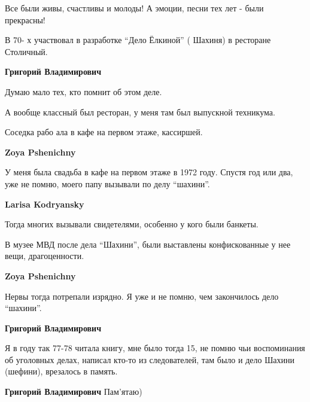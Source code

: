 \begin{itemize}
\begin{itemize}
Все были живы, счастливы и молоды! А эмоции, песни тех лет - были прекрасны!
\end{itemize} %


В 70- х участвовал в разработке \enquote{Дело Ёлкиной} ( Шахиня) в ресторане
Столичный.

\begin{itemize} %
\textbf{Григорий Владимирович} 

Думаю мало тех, кто помнит об этом деле.

А вообще классный был ресторан, у меня там был выпускной техникума.

Соседка рабо ала в кафе на первом этаже, кассиршей.

\begin{itemize} %
\textbf{Zoya Pshenichny} 

У меня была свадьба в кафе на первом этаже в 1972 году. Спустя год или два, уже
не помню, моего папу вызывали по делу \enquote{шахини}.

\textbf{Larisa Kodryansky} 

Тогда многих вызывали свидетелями, особенно у кого были банкеты.

В музее МВД после дела \enquote{Шахини}, были выставлены конфискованные у нее вещи,
драгоценности.

\textbf{Zoya Pshenichny} 

Нервы тогда потрепали изрядно. Я уже и не помню, чем закончилось дело \enquote{шахини}.

\end{itemize} %

\textbf{Григорий Владимирович} 

Я в году так 77-78 читала книгу, мне было тогда 15, не помню чьи воспоминания
об уголовных делах, написал кто-то из следователей, там было и дело Шахини
(шефини), врезалось в память.

\textbf{Григорий Владимирович} Пам'ятаю)

\end{itemize} %

\end{itemize} %
